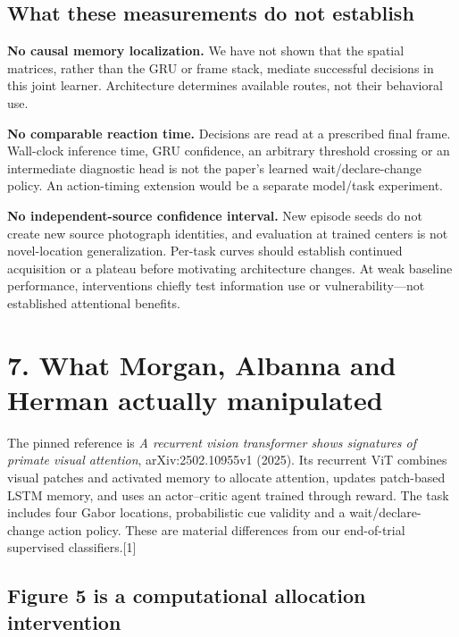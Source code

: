 \documentclass[
  10pt,
]{article}
\begin{document}
\subsection{What these measurements do not
establish}\label{what-these-measurements-do-not-establish}

\textbf{No causal memory localization.} We have not shown that the
spatial matrices, rather than the GRU or frame stack, mediate successful
decisions in this joint learner. Architecture determines available
routes, not their behavioral use.

\textbf{No comparable reaction time.} Decisions are read at a prescribed
final frame. Wall-clock inference time, GRU confidence, an arbitrary
threshold crossing or an intermediate diagnostic head is not the paper's
learned wait/declare-change policy. An action-timing extension would be
a separate model/task experiment.

\textbf{No independent-source confidence interval.} New episode seeds do
not create new source photograph identities, and evaluation at trained
centers is not novel-location generalization. Per-task curves should
establish continued acquisition or a plateau before motivating
architecture changes. At weak baseline performance, interventions
chiefly test information use or vulnerability---not established
attentional benefits.

\newpage

\section{7. What Morgan, Albanna and Herman actually
manipulated}\label{what-morgan-albanna-and-herman-actually-manipulated}

The pinned reference is \emph{A recurrent vision transformer shows
signatures of primate visual attention}, arXiv:2502.10955v1 (2025). Its
recurrent ViT combines visual patches and activated memory to allocate
attention, updates patch-based LSTM memory, and uses an actor--critic
agent trained through reward. The task includes four Gabor locations,
probabilistic cue validity and a wait/declare-change action policy.
These are material differences from our end-of-trial supervised
classifiers.{[}1{]}

\subsection{Figure 5 is a computational allocation
intervention}\label{figure-5-is-a-computational-allocation-intervention}
\end{document}
